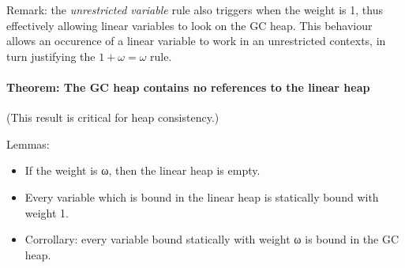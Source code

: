 \documentclass[11pt]{article}
\begin{document}
Remark: the \emph{unrestricted variable} rule also triggers when the
weight is 1, thus effectively allowing linear variables to look on the
GC heap. This behaviour allows an occurence of a linear variable to
work in an unrestricted contexts, in turn justifying the $1 + ω = ω$
rule.

\paragraph{Theorem: The GC heap contains no references to the linear heap}
(This result is critical for heap consistency.)

Lemmas:
\begin{itemize}
\item If the weight is ω, then the linear heap is empty.

\item Every variable which is bound in the linear heap is statically
  bound with weight 1.
\item Corrollary: every variable bound statically with weight ω is
  bound in the GC heap.
\end{itemize}











\end{document}

